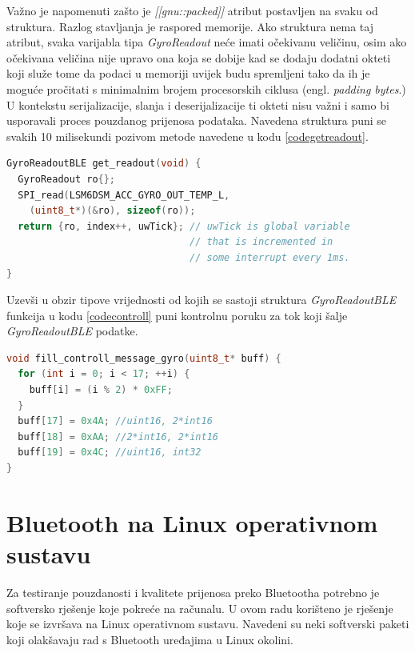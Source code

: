 \documentclass[times, utf8, diplomski]{diplomski}
\begin{document}
Važno je napomenuti zašto je \textit{[[gnu::packed]]} atribut postavljen na svaku od struktura. Razlog stavljanja je raspored memorije.
Ako struktura nema taj atribut, svaka varijabla tipa \textit{GyroReadout} neće imati očekivanu veličinu, osim ako očekivana veličina nije upravo ona koja se dobije kad se dodaju dodatni okteti koji služe tome da podaci u memoriji uvijek budu spremljeni tako da ih je moguće pročitati s minimalnim brojem procesorskih ciklusa (engl. \textit{padding bytes}.)
U kontekstu serijalizacije, slanja i deserijalizacije ti okteti nisu važni i samo bi usporavali proces pouzdanog prijenosa podataka.
Navedena struktura puni se svakih 10 milisekundi pozivom metode navedene u kodu \ref{codegetreadout}.

\begin{lstlisting}[language=c++, caption={Dohvaćanje očitanja s LSM6DSM senzora}, label={codegetreadout}]
GyroReadoutBLE get_readout(void) {
  GyroReadout ro{};
  SPI_read(LSM6DSM_ACC_GYRO_OUT_TEMP_L,
    (uint8_t*)(&ro), sizeof(ro));
  return {ro, index++, uwTick}; // uwTick is global variable
                                // that is incremented in 
                                // some interrupt every 1ms.
}
\end{lstlisting}

Uzevši u obzir tipove vrijednosti od kojih se sastoji struktura \textit{GyroReadoutBLE} funkcija u kodu \ref{codecontroll} puni kontrolnu poruku za tok koji šalje \textit{GyroReadoutBLE} podatke.

\begin{lstlisting}[language=c++, caption={Funkcija koja puni kontrolnu poruku za žiroskopske podatke}, label={codecontroll}]
void fill_controll_message_gyro(uint8_t* buff) {
  for (int i = 0; i < 17; ++i) {
    buff[i] = (i % 2) * 0xFF;
  }
  buff[17] = 0x4A; //uint16, 2*int16
  buff[18] = 0xAA; //2*int16, 2*int16
  buff[19] = 0x4C; //uint16, int32
}
\end{lstlisting}

\section{Bluetooth na Linux operativnom sustavu}
Za testiranje pouzdanosti i kvalitete prijenosa preko Bluetootha potrebno je softversko rješenje koje pokreće na računalu. U ovom radu korišteno je rješenje koje se izvršava na Linux operativnom sustavu. Navedeni su neki softverski paketi koji olakšavaju rad s Bluetooth uređajima u Linux okolini.
\end{document}
